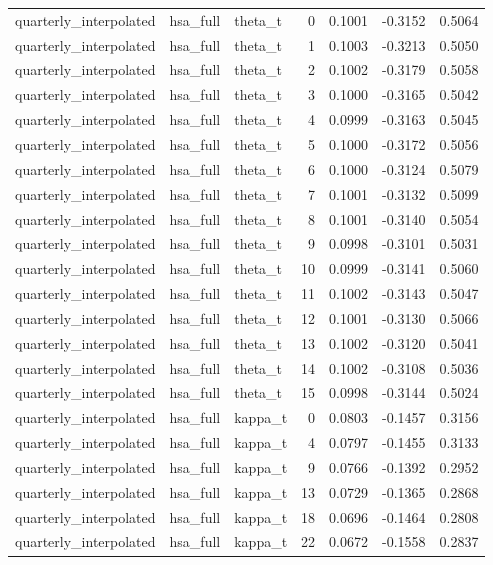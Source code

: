 \begin{tabular}{lllrrrr}
quarterly\_interpolated & hsa\_full & theta\_t & 0 & 0.1001 & -0.3152 & 0.5064 \\
quarterly\_interpolated & hsa\_full & theta\_t & 1 & 0.1003 & -0.3213 & 0.5050 \\
quarterly\_interpolated & hsa\_full & theta\_t & 2 & 0.1002 & -0.3179 & 0.5058 \\
quarterly\_interpolated & hsa\_full & theta\_t & 3 & 0.1000 & -0.3165 & 0.5042 \\
quarterly\_interpolated & hsa\_full & theta\_t & 4 & 0.0999 & -0.3163 & 0.5045 \\
quarterly\_interpolated & hsa\_full & theta\_t & 5 & 0.1000 & -0.3172 & 0.5056 \\
quarterly\_interpolated & hsa\_full & theta\_t & 6 & 0.1000 & -0.3124 & 0.5079 \\
quarterly\_interpolated & hsa\_full & theta\_t & 7 & 0.1001 & -0.3132 & 0.5099 \\
quarterly\_interpolated & hsa\_full & theta\_t & 8 & 0.1001 & -0.3140 & 0.5054 \\
quarterly\_interpolated & hsa\_full & theta\_t & 9 & 0.0998 & -0.3101 & 0.5031 \\
quarterly\_interpolated & hsa\_full & theta\_t & 10 & 0.0999 & -0.3141 & 0.5060 \\
quarterly\_interpolated & hsa\_full & theta\_t & 11 & 0.1002 & -0.3143 & 0.5047 \\
quarterly\_interpolated & hsa\_full & theta\_t & 12 & 0.1001 & -0.3130 & 0.5066 \\
quarterly\_interpolated & hsa\_full & theta\_t & 13 & 0.1002 & -0.3120 & 0.5041 \\
quarterly\_interpolated & hsa\_full & theta\_t & 14 & 0.1002 & -0.3108 & 0.5036 \\
quarterly\_interpolated & hsa\_full & theta\_t & 15 & 0.0998 & -0.3144 & 0.5024 \\
quarterly\_interpolated & hsa\_full & kappa\_t & 0 & 0.0803 & -0.1457 & 0.3156 \\
quarterly\_interpolated & hsa\_full & kappa\_t & 4 & 0.0797 & -0.1455 & 0.3133 \\
quarterly\_interpolated & hsa\_full & kappa\_t & 9 & 0.0766 & -0.1392 & 0.2952 \\
quarterly\_interpolated & hsa\_full & kappa\_t & 13 & 0.0729 & -0.1365 & 0.2868 \\
quarterly\_interpolated & hsa\_full & kappa\_t & 18 & 0.0696 & -0.1464 & 0.2808 \\
quarterly\_interpolated & hsa\_full & kappa\_t & 22 & 0.0672 & -0.1558 & 0.2837 \\

\end{tabular}
